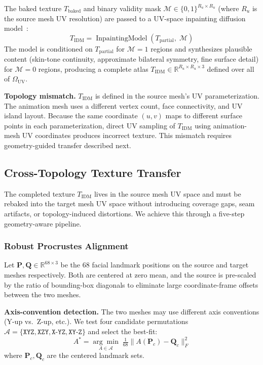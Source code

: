 \documentclass[conference]{IEEEtran}
\newcommand{\R}{\mathbb{R}}
\newcommand{\OUV}{\Omega_{\text{UV}}}
\newcommand{\Tbaked}{T_{\text{baked}}}
\newcommand{\Tpartial}{T_{\text{partial}}}
\newcommand{\TIDM}{T_{\text{IDM}}}
\newcommand{\cM}{\mathcal{M}}       %
\begin{document}
The baked texture $\Tbaked$ and binary validity mask $\cM \in \{0,1\}^{R_u \times R_u}$
(where $R_u$ is the source mesh UV resolution) are passed to a UV-space
inpainting diffusion model~\cite{bai2023uvidm}:
\begin{equation}
  \TIDM = \operatorname{InpaintingModel}(\Tpartial,\; \cM)
  \label{eq:inpainting}
\end{equation}
The model is conditioned on $\Tpartial$ for $\cM=1$ regions and synthesizes
plausible content (skin-tone continuity, approximate bilateral symmetry,
fine surface detail) for $\cM=0$ regions, producing a complete atlas
$\TIDM \in \R^{R_u \times R_u \times 3}$ defined over all of $\OUV$.

\medskip\noindent\textbf{Topology mismatch.}
$\TIDM$ is defined in the source mesh's UV parameterization. The animation mesh
uses a different vertex count, face connectivity, and UV island layout. Because
the same coordinate $(u,v)$ maps to different surface points in each
parameterization, direct UV sampling of $\TIDM$ using animation-mesh UV
coordinates produces incorrect texture. This mismatch requires geometry-guided
transfer described next.

\subsection{Cross-Topology Texture Transfer}
\label{sec:transfer}

The completed texture $\TIDM$ lives in the source mesh UV space and must be
rebaked into the target mesh UV space without introducing coverage gaps, seam
artifacts, or topology-induced distortions. We achieve this through a five-step
geometry-aware pipeline.

\subsubsection{Robust Procrustes Alignment}

Let $\mathbf{P}, \mathbf{Q} \in \R^{68 \times 3}$ be the 68 facial landmark
positions on the source and target meshes respectively. Both are centered at
zero mean, and the source is pre-scaled by the ratio of bounding-box diagonals
to eliminate large coordinate-frame offsets between the two meshes.

\medskip\noindent\textbf{Axis-convention detection.}
The two meshes may use different axis conventions (Y-up vs.\ Z-up, etc.).
We test four candidate permutations $\mathcal{A} = \{\texttt{XYZ}, \texttt{XZY},
\texttt{X{-}YZ}, \texttt{XY{-}Z}\}$ and select the best-fit:
\begin{equation}
  A^* = \underset{A \in \mathcal{A}}{\arg\min}\;
        \tfrac{1}{68}\|A(\mathbf{P}_c) - \mathbf{Q}_c\|_F^2
  \label{eq:axis_detect}
\end{equation}
where $\mathbf{P}_c, \mathbf{Q}_c$ are the centered landmark sets.
\end{document}
